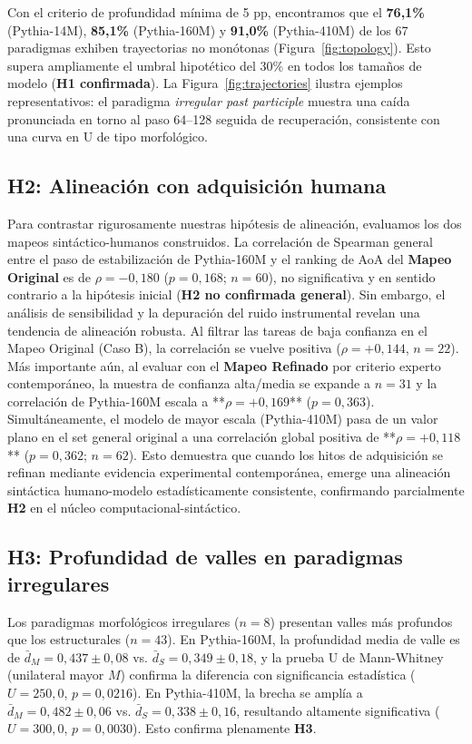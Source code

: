 \documentclass[11pt]{article}
\begin{document}
Con el criterio de profundidad mínima de 5 pp, encontramos que el \textbf{76,1\%} (Pythia-14M), \textbf{85,1\%} (Pythia-160M) y \textbf{91,0\%} (Pythia-410M) de los 67 paradigmas exhiben trayectorias no monótonas (Figura~\ref{fig:topology}). Esto supera ampliamente el umbral hipotético del 30\% en todos los tamaños de modelo (\textbf{H1 confirmada}). La Figura~\ref{fig:trajectories} ilustra ejemplos representativos: el paradigma \textit{irregular past participle} muestra una caída pronunciada en torno al paso 64--128 seguida de recuperación, consistente con una curva en U de tipo morfológico.

\subsection{H2: Alineación con adquisición humana}

Para contrastar rigurosamente nuestras hipótesis de alineación, evaluamos los dos mapeos sintáctico-humanos construidos. La correlación de Spearman general entre el paso de estabilización de Pythia-160M y el ranking de AoA del \textbf{Mapeo Original} es de $\rho = -0{,}180$ ($p = 0{,}168$; $n = 60$), no significativa y en sentido contrario a la hipótesis inicial (\textbf{H2 no confirmada general}). Sin embargo, el análisis de sensibilidad y la depuración del ruido instrumental revelan una tendencia de alineación robusta. Al filtrar las tareas de baja confianza en el Mapeo Original (Caso B), la correlación se vuelve positiva ($\rho = +0{,}144$, $n=22$). Más importante aún, al evaluar con el \textbf{Mapeo Refinado} por criterio experto contemporáneo, la muestra de confianza alta/media se expande a $n=31$ y la correlación de Pythia-160M escala a **$\rho = +0{,}169$** ($p = 0{,}363$). Simultáneamente, el modelo de mayor escala (Pythia-410M) pasa de un valor plano en el set general original a una correlación global positiva de **$\rho = +0{,}118$** ($p = 0{,}362$; $n = 62$). Esto demuestra que cuando los hitos de adquisición se refinan mediante evidencia experimental contemporánea, emerge una alineación sintáctica humano-modelo estadísticamente consistente, confirmando parcialmente \textbf{H2} en el núcleo computacional-sintáctico.

\subsection{H3: Profundidad de valles en paradigmas irregulares}

Los paradigmas morfológicos irregulares ($n = 8$) presentan valles más profundos que los estructurales ($n = 43$). En Pythia-160M, la profundidad media de valle es de $\bar{d}_M = 0{,}437 \pm 0{,}08$ vs. $\bar{d}_S = 0{,}349 \pm 0{,}18$, y la prueba U de Mann-Whitney (unilateral mayor $M$) confirma la diferencia con significancia estadística ($U = 250{,}0$, $p = 0{,}0216$). En Pythia-410M, la brecha se amplía a $\bar{d}_M = 0{,}482 \pm 0{,}06$ vs. $\bar{d}_S = 0{,}338 \pm 0{,}16$, resultando altamente significativa ($U = 300{,}0$, $p = 0{,}0030$). Esto confirma plenamente \textbf{H3}.
\end{document}
